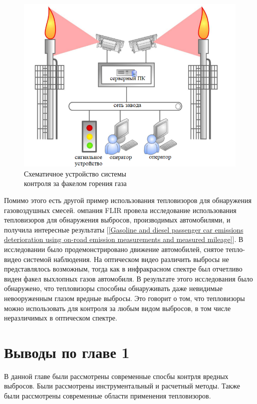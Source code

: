 \documentclass[14pt, a4paper]{extreport}
\begin{document}
	\begin{figure}[ht!]
		\centering
		\includegraphics[width = 13cm]{image/chapter_1/controlGasSystem}	
		\caption{Схематичное устройство системы\\контроля за факелом горения газа}
		\label{fig:controlGasSystem}
	\end{figure}

	Помимо этого есть другой пример использования тепловизоров для обнаружения газовоздушных смесей. омпания FLIR провела исследование использования тепловизоров для обнаружения выбросов, производимых автомобилями, и получила интересные результаты [\ref{Gasoline and diesel passenger car emissions deterioration using on-road emission measurements and measured mileage}]. В исследовании было продемонстрировано движение автомобилей, снятое тепло-видео системой наблюдения. На оптическом видео различить выбросы не представлялось возможным, тогда как в инфракрасном спектре был отчетливо виден факел выхлопных газов автомобиля. В результате этого исследования было обнаружено, что тепловизоры способны обнаруживать даже невидимые невооруженным глазом вредные выбросы. Это говорит о том, что тепловизоры можно использовать  для контроля за любым видом выбросов, в том числе неразличимых в оптическом спектре. 
	
\section{Выводы по главе 1}
	В данной главе были рассмотрены современные спосбы контрля вредных выбросов. Были рассмотрены инструментальный и расчетный методы. Также были рассмотрены современные области применения тепловизоров.
	
\end{document}
